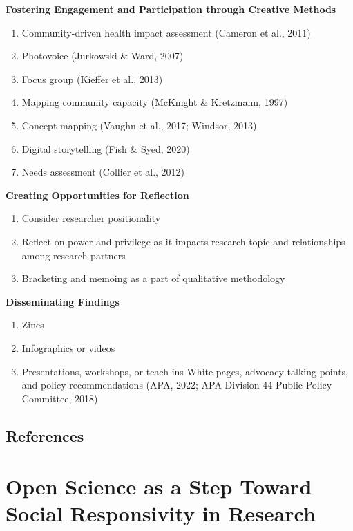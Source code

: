 \documentclass[
  11pt,
]{book}
\providecommand{\tightlist}{%
  \setlength{\itemsep}{0pt}\setlength{\parskip}{0pt}}
\begin{document}
\textbf{Fostering Engagement and Participation through Creative Methods}

\begin{enumerate}
\def\labelenumi{\arabic{enumi}.}
\tightlist
\item
  Community-driven health impact assessment (Cameron et al., 2011)
\item
  Photovoice (Jurkowski \& Ward, 2007)
\item
  Focus group (Kieffer et al., 2013)
\item
  Mapping community capacity (McKnight \& Kretzmann, 1997)
\item
  Concept mapping (Vaughn et al., 2017; Windsor, 2013)
\item
  Digital storytelling (Fish \& Syed, 2020)
\item
  Needs assessment (Collier et al., 2012)
\end{enumerate}

\textbf{Creating Opportunities for Reflection}

\begin{enumerate}
\def\labelenumi{\arabic{enumi}.}
\tightlist
\item
  Consider researcher positionality
\item
  Reflect on power and privilege as it impacts research topic and relationships among research partners
\item
  Bracketing and memoing as a part of qualitative methodology
\end{enumerate}

\textbf{Disseminating Findings}

\begin{enumerate}
\def\labelenumi{\arabic{enumi}.}
\tightlist
\item
  Zines
\item
  Infographics or videos
\item
  Presentations, workshops, or teach-ins
  White pages, advocacy talking points, and policy recommendations (APA, 2022; APA Division 44 Public Policy Committee, 2018)
\end{enumerate}

\hypertarget{references-1}{%
\section{References}\label{references-1}}

\hypertarget{OpSci}{%
\chapter{Open Science as a Step Toward Social Responsivity in Research}\label{OpSci}}
\end{document}
